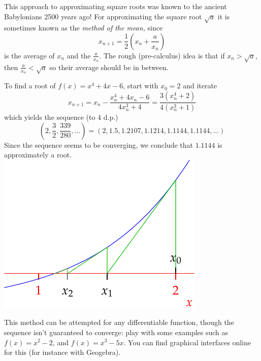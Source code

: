 This approach to approximating square roots was known to the ancient Babylonians 2500 years ago! For approximating the square root $\sqrt a$ it is sometimes known as the \emph{method of the mean,} since 
\[
	x_{n+1}=\frac 12\left(x_n+\frac a{x_n}\right)
\]
is the average of $x_n$ and the $\frac a{x_n}$. The rough (pre-calculus) idea is that if $x_n>\sqrt a$, then $\frac a{x_n}<\sqrt a$ so their average should be in between.  

\begin{example}[lower separated=false, sidebyside, sidebyside align=top seam, sidebyside gap=0pt, righthand width=0.4\linewidth]{}{}
To find a root of $f(x)=x^4+4x-6$, start with $x_0=2$ and iterate
\[x_{n+1}=x_n-\frac{x_n^4+4x_n-6}{4x_n^3+4} =\frac{3(x_n^4+2)}{4(x_n^3+1)}\]
which yields the sequence (to 4 d.p.)
\[\left(2,\frac 32,\frac{339}{280},\ldots\right)=(2,1.5,1.2107,1.1214,1.1144,1.1144,\ldots)\]
Since the sequence seems to be converging, we conclude that $1.1144$ is approximately a root.
\tcblower
\flushright\includegraphics{newton-raphson2}
\end{example}

This method can be attempted for any differentiable function, though the sequence isn't guaranteed to converge: play with some examples such as $f(x)=x^2-2$, and $f(x)=x^3-5x$. You can find graphical interfaces online for this (for instance with Geogebra).

